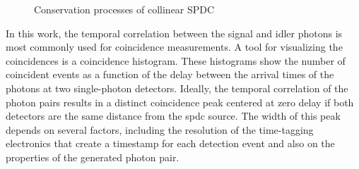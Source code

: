 \begin{figure}[!bt]
{
	}%
	
	\caption{Conservation processes of collinear SPDC}
	\label{fig:SPDC}
\end{figure} 
In this work, the temporal correlation between the signal and idler photons is most commonly used for coincidence measurements. A tool for visualizing the coincidences is a coincidence histogram. These histograms show the number of coincident events as a function of the delay between the arrival times of the photons at two single-photon detectors. \newline
Ideally, the temporal correlation of the photon pairs results in a distinct coincidence peak centered at zero delay if both detectors are the same distance from the \acrshort{spdc} source. 
The width of this peak depends on several factors, including the resolution of the time-tagging electronics that create a timestamp for each detection event and also on the properties of the generated photon pair. \newline
